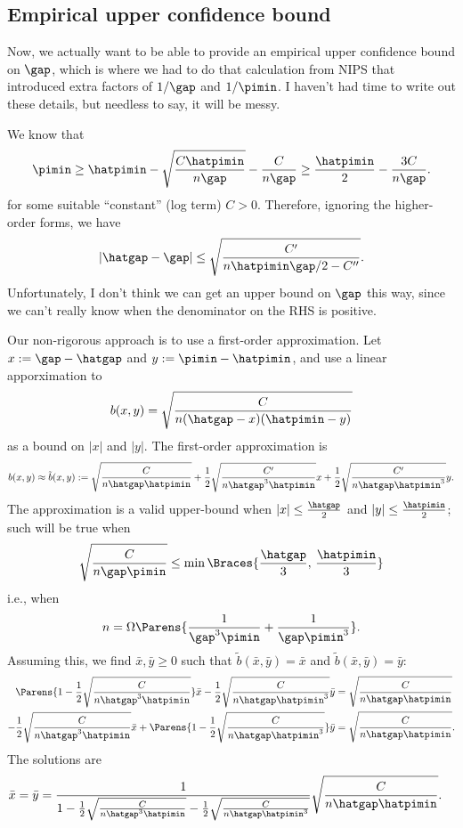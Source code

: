 \subsection{Empirical upper confidence bound}

Now, we actually want to be able to provide an empirical upper
confidence bound on $\gap$, which is where we had to do that
calculation from NIPS that introduced extra factors of $1/\gap$ and
$1/\pimin$.
I haven't had time to write out these details, but needless to say, it
will be messy.

We know that
\[
  \pimin \geq \hatpimin - \sqrt{\frac{C\hatpimin}{n\gap}} -
  \frac{C}{n\gap}
  \geq \frac{\hatpimin}{2} - \frac{3C}{n\gap}
  .
\]
for some suitable ``constant'' (log term) $C>0$.
Therefore, ignoring the higher-order forms, we have
\[
  |\hatgap-\gap|
  \leq \sqrt{\frac{C'}{n\hatpimin\gap/2-C''}}
  .
\]
Unfortunately, I don't think we can get an upper bound on $\gap$ this
way, since we can't really know when the denominator on the RHS is
positive. 

Our non-rigorous approach is to use a first-order approximation.
Let $x := \gap - \hatgap$ and $y := \pimin - \hatpimin$, and use a
linear apporximation to
\[
  b(x,y) = \sqrt{\frac{C}{n(\hatgap-x)(\hatpimin-y)}}
\]
as a bound on $|x|$ and $|y|$.
The first-order approximation is
\[
  b(x,y)
  \approx \tilde{b}(x,y)
  :=
  \sqrt{\frac{C}{n\hatgap\hatpimin}}
  + \frac12\sqrt{\frac{C'}{n\hatgap^3\hatpimin}}x
  + \frac12\sqrt{\frac{C'}{n\hatgap\hatpimin^3}}y
  .
\]
The approximation is a valid upper-bound when $|x| \leq
\frac{\hatgap}2$ and $|y| \leq \frac{\hatpimin}2$; such will be true
when
\[
  \sqrt{\frac{C}{n\gap\pimin}} \leq \min\Braces{ \frac{\hatgap}{3} ,\,
  \frac{\hatpimin}{3} }
\]
i.e., when
\[
  n = \Omega\Parens{ \frac1{\gap^3\pimin} + \frac1{\gap\pimin^3} } .
\]
Assuming this, we find $\bar{x},\bar{y} \geq 0$ such that
$\tilde{b}(\bar{x},\bar{y}) = \bar{x}$ and $\tilde{b}(\bar{x},\bar{y})
= \bar{y}$:
\begin{align*}
  \Parens{
    1 - \frac12\sqrt{\frac{C}{n\hatgap^3\hatpimin}}
  } \bar{x}
  - \frac12\sqrt{\frac{C}{n\hatgap\hatpimin^3}}
  \bar{y}
  & =
  \sqrt{\frac{C}{n\hatgap\hatpimin}}
  \\
  - \frac12\sqrt{\frac{C}{n\hatgap^3\hatpimin}}
  \bar{x}
  + \Parens{
    1 - \frac12\sqrt{\frac{C}{n\hatgap\hatpimin^3}}
  }
  \bar{y}
  & =
  \sqrt{\frac{C}{n\hatgap\hatpimin}}
  .
\end{align*}
The solutions are
\begin{align*}
  \bar{x} 
  = \bar{y}
  & = \frac{1}{
    1 - \frac12\sqrt{\frac{C}{n\hatgap^3\hatpimin}}
    - \frac12\sqrt{\frac{C}{n\hatgap\hatpimin^3}}
  }
  \sqrt{\frac{C}{n\hatgap\hatpimin}}
  .
\end{align*}
\fi
